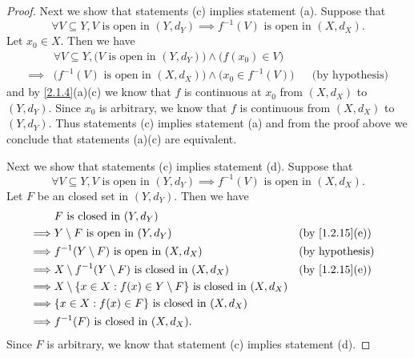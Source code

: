 \begin{proof}
  Next we show that statements (c) implies statement (a).
  Suppose that
  \[
    \forall V \subseteq Y, V \text{ is open in } (Y, d_Y) \implies f^{-1}(V) \text{ is open in } (X, d_X).
  \]
  Let \(x_0 \in X\).
  Then we have
  \begin{align*}
             & \forall V \subseteq Y, \big(V \text{ is open in } (Y, d_Y)\big) \land \big(f(x_0) \in V\big)                             \\
    \implies & \big(f^{-1}(V) \text{ is open in } (X, d_X)\big) \land \big(x_0 \in f^{-1}(V)\big)           &  & \text{(by hypothesis)}
  \end{align*}
  and by \cref{2.1.4}(a)(c) we know that \(f\) is continuous at \(x_0\) from \((X, d_X)\) to \((Y, d_Y)\).
  Since \(x_0\) is arbitrary, we know that \(f\) is continuous from \((X, d_X)\) to \((Y, d_Y)\).
  Thus statements (c) implies statement (a) and from the proof above we conclude that statements (a)(c) are equivalent.

  Next we show that statements (c) implies statement (d).
  Suppose that
  \[
    \forall V \subseteq Y, V \text{ is open in } (Y, d_Y) \implies f^{-1}(V) \text{ is open in } (X, d_X).
  \]
  Let \(F\) be an closed set in \((Y, d_Y)\).
  Then we have
  \begin{align*}
             & F \text{ is closed in } (Y, d_Y)                                                                                    \\
    \implies & Y \setminus F \text{ is open in } (Y, d_Y)                                        &  & \text{(by \cref{1.2.15}(e))} \\
    \implies & f^{-1}(Y \setminus F) \text{ is open in } (X, d_X)                                &  & \text{(by hypothesis)}       \\
    \implies & X \setminus f^{-1}(Y \setminus F) \text{ is closed in } (X, d_X)                  &  & \text{(by \cref{1.2.15}(e))} \\
    \implies & X \setminus \set{x \in X : f(x) \in Y \setminus F} \text{ is closed in } (X, d_X)                                   \\
    \implies & \set{x \in X : f(x) \in F} \text{ is closed in } (X, d_X)                                                           \\
    \implies & f^{-1}(F) \text{ is closed in } (X, d_X).
  \end{align*}
  Since \(F\) is arbitrary, we know that statement (c) implies statement (d).


\end{proof}
